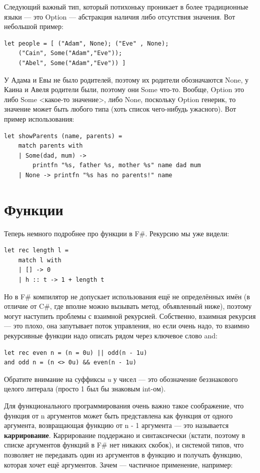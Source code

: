 \documentclass[a5paper]{article}
\begin{document}
Следующий важный тип, который потихоньку проникает в более традиционные языки --- это Option --- абстракция наличия либо отсутствия значения. Вот небольшой пример:

\begin{verbatim}
let people = [ ("Adam", None); ("Eve" , None);
    ("Cain", Some("Adam","Eve"));
    ("Abel", Some("Adam","Eve")) ]
\end{verbatim}

У Адама и Евы не было родителей, поэтому их родители обозначаются None, у Каина и Авеля родители были, поэтому они Some что-то. Вообще, Option это либо Some <какое-то значение>, либо None, поскольку Option генерик, то значение может быть любого типа (хоть список чего-нибудь ужасного). Вот пример использования:

\begin{verbatim}
let showParents (name, parents) =
    match parents with
    | Some(dad, mum) -> 
        printfn "%s, father %s, mother %s" name dad mum
    | None -> printfn "%s has no parents!" name
\end{verbatim}

\section{Функции}

Теперь немного подробнее про функции в F\#. Рекурсию мы уже видели:

\begin{verbatim}
let rec length l =
    match l with
    | [] -> 0
    | h :: t -> 1 + length t
\end{verbatim}

Но в F\# компилятор не допускает использования ещё не определённых имён (в отличие от C\#, где вполне можно вызывать метод, объявленный ниже), поэтому могут наступить проблемы с взаимной рекурсией. Собственно, взаимная рекурсия --- это плохо, она запутывает поток управления, но если очень надо, то взаимно рекурсивные функции надо описать рядом через ключевое слово and:

\begin{verbatim}
let rec even n = (n = 0u) || odd(n - 1u)
and odd n = (n <> 0u) && even(n - 1u)
\end{verbatim}

Обратите внимание на суффиксы \textit{u} у чисел --- это обозначение беззнакового целого литерала (просто 1 был бы знаковым int-ом).

Для функционального программирования очень важно такое соображение, что функция от n аргументов может быть представлена как функция от одного аргумента, возвращающая функцию от n - 1 аргумента --- это называется \textbf{каррирование}. Каррирование поддержано и синтаксически (кстати, поэтому в списке аргументов функций в F\# нет никаких скобок), и системой типов, что позволяет не передавать один из аргументов в функцию и получать функцию, которая хочет ещё аргументов. Зачем --- частичное применение, например:
\end{document}
